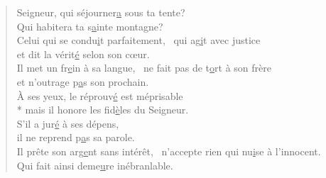 
\begin{verse}
Seigneur, qui séjourner\underline{a} sous ta tente? \\
Qui habitera ta s\underline{a}inte montagne? \\

Celui qui se condu\underline{i}t parfaitement,~\psalmdagger
qui ag\underline{i}t avec justice \\
et dit la vérit\underline{é} selon son cœur. \\

Il met un fr\underline{e}in à sa langue,~\psalmdagger
ne fait pas de t\underline{o}rt à son frère \\
et n’outrage p\underline{a}s son prochain. \\

À ses yeux, le réprouv\underline{é} est méprisable \\*
mais il honore les fid\underline{è}les du Seigneur. \\

S’il a jur\underline{é} à ses dépens, \\
il ne reprend p\underline{a}s sa parole. \\

Il prête son arg\underline{e}nt sans intérêt,~\psalmdagger
n’accepte rien qui nu\underline{i}se à l’innocent. \\
Qui fait ainsi deme\underline{u}re inébranlable. \\
\end{verse}

